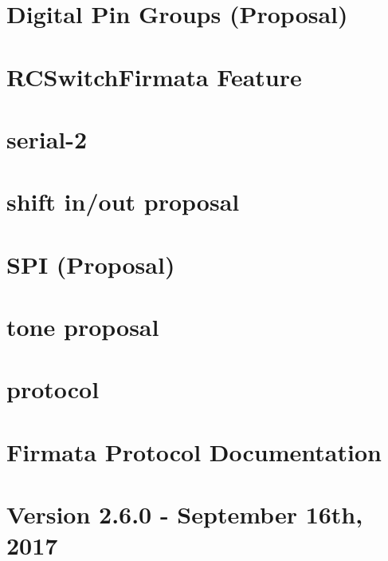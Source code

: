 \let\mypdfximage\pdfximage\def\pdfximage{\immediate\mypdfximage}\documentclass[twoside]{book}
\newcommand{\+}{\discretionary{\mbox{\scriptsize$\hookleftarrow$}}{}{}}
\begin{document}
\chapter{Digital Pin Groups (Proposal)}
\label{md_protocol_proposals_pingroups-proposal}

\chapter{R\+C\+Switch\+Firmata Feature}
\label{md_protocol_proposals_rcswitch-proposal}

\chapter{serial-\/2}
\label{md_protocol_proposals_serial-2_80-proposal}

\chapter{shift in/out proposal}
\label{md_protocol_proposals_shift-proposal}

\chapter{S\+PI (Proposal)}
\label{md_protocol_proposals_spi-proposal}

\chapter{tone proposal}
\label{md_protocol_proposals_tone-proposal}

\chapter{protocol}
\label{md_protocol_protocol}

\chapter{Firmata Protocol Documentation}
\label{md_protocol__r_e_a_d_m_e}

\chapter{Version 2.6.0 -\/ September 16th, 2017}
\label{md_protocol_revisions}

\end{document}
